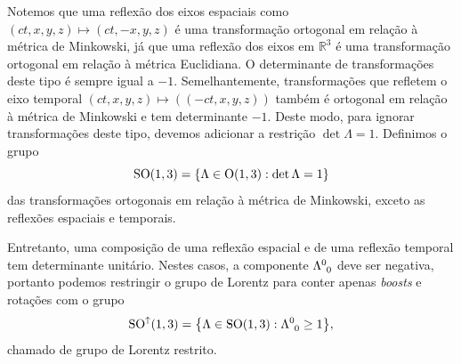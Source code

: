\documentclass[12pt,a4paper]{article}
\numberwithin{equation}{section}
\DeclarePairedDelimiter\set{\{}{\}}
\begin{document}
Notemos que uma reflexão dos eixos espaciais como \((ct, x,y,z) \mapsto (ct, -x, y, z)\) é uma transformação ortogonal em relação à métrica de Minkowski, já que uma reflexão dos eixos em \(\mathbb{R}^3\) é uma transformação ortogonal em relação à métrica Euclidiana. O determinante de transformações deste tipo é sempre igual a \(-1\). Semelhantemente, transformações que refletem o eixo temporal \((ct, x,y, z) \mapsto ((-ct, x,y, z))\) também é ortogonal em relação à métrica de Minkowski e tem determinante \(-1\). Deste modo, para ignorar transformações deste tipo, devemos adicionar a restrição \(\det \Lambda = 1\). Definimos o grupo
\begin{equation*}
    \mathrm{SO}(1,3) = \set*{\Lambda \in \mathrm{O}(1,3) : \det \Lambda = 1}
\end{equation*}
das transformações ortogonais em relação à métrica de Minkowski, exceto as reflexões espaciais e temporais.

Entretanto, uma composição de uma reflexão espacial e de uma reflexão temporal tem determinante unitário. Nestes casos, a componente \(\Lambda\indices{^0_0}\) deve ser negativa, portanto podemos restringir o grupo de Lorentz para conter apenas \textit{boosts} e rotações com o grupo
\begin{equation*}
    \mathrm{SO}^\uparrow(1,3) = \set*{\Lambda \in \mathrm{SO}(1,3) : \Lambda\indices{^0_0} \geq 1},
\end{equation*}
chamado de grupo de Lorentz restrito.
\end{document}
